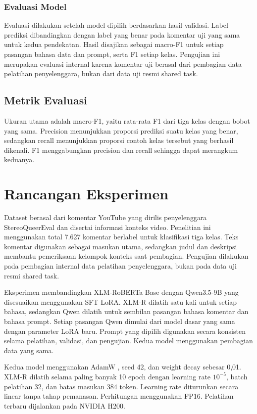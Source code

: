 \documentclass[11pt]{article}
\begin{document}
\subsubsection{Evaluasi Model}
Evaluasi dilakukan setelah model dipilih berdasarkan hasil validasi. Label prediksi dibandingkan dengan label yang benar pada komentar uji yang sama untuk kedua pendekatan. Hasil disajikan sebagai macro-F1 untuk setiap pasangan bahasa data dan prompt, serta F1 setiap kelas. Pengujian ini merupakan evaluasi internal karena komentar uji berasal dari pembagian data pelatihan penyelenggara, bukan dari data uji resmi shared task.

\subsection{Metrik Evaluasi}
Ukuran utama adalah macro-F1, yaitu rata-rata F1 dari tiga kelas dengan bobot yang sama. Precision menunjukkan proporsi prediksi suatu kelas yang benar, sedangkan recall menunjukkan proporsi contoh kelas tersebut yang berhasil dikenali. F1 menggabungkan precision dan recall sehingga dapat merangkum keduanya.

\section{Rancangan Eksperimen}
Dataset berasal dari komentar YouTube yang dirilis penyelenggara StereoQueerEval dan disertai informasi konteks video. Penelitian ini menggunakan total 7.627 komentar berlabel untuk klasifikasi tiga kelas. Teks komentar digunakan sebagai masukan utama, sedangkan judul dan deskripsi membantu pemeriksaan kelompok konteks saat pembagian. Pengujian dilakukan pada pembagian internal data pelatihan penyelenggara, bukan pada data uji resmi shared task.

Eksperimen membandingkan XLM-RoBERTa Base dengan Qwen3.5-9B yang disesuaikan menggunakan SFT LoRA. XLM-R dilatih satu kali untuk setiap bahasa, sedangkan Qwen dilatih untuk sembilan pasangan bahasa komentar dan bahasa prompt. Setiap pasangan Qwen dimulai dari model dasar yang sama dengan parameter LoRA baru. Prompt yang dipilih digunakan secara konsisten selama pelatihan, validasi, dan pengujian. Kedua model menggunakan pembagian data yang sama.

Kedua model menggunakan AdamW \citep{loshchilov-hutter-2019-decoupled}, seed 42, dan weight decay sebesar 0,01. XLM-R dilatih selama paling banyak 10 epoch dengan learning rate $10^{-5}$, batch pelatihan 32, dan batas masukan 384 token. Learning rate diturunkan secara linear tanpa tahap pemanasan. Perhitungan menggunakan FP16. Pelatihan terbaru dijalankan pada NVIDIA H200.
\end{document}
